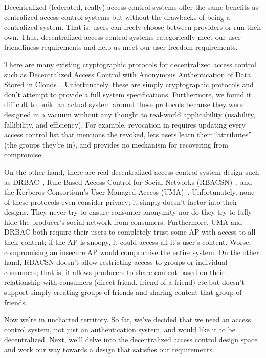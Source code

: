 \documentclass[pdftex,12pt,a4papaer,twoside,notitlepage]{report}
\begin{document}
Decentralized (federated, really) access control systems offer the same benefits
as centralized access control systems but without the drawbacks of being a
centralized system. That is, users can freely choose between providers or run
their own. Thus, decentralized access control systems categorically meet our
user friendliness requirements and help us meet our user freedom requirements.

There are many existing cryptographic protocols for decentralized access control
such as Decentralized Access Control with Anonymous Authentication of Data
Stored in Clouds~\cite{attrib}. Unfortunately, these are simply cryptographic
protocols and don't attempt to provide a full system specifications.
Furthermore, we found it difficult to build an actual system around these
protocols because they were designed in a vacuum without any thought to
real-world applicability (usability, fallibility, and efficiency). For example,
revocation in \cite{attrib} requires updating every access control list that
mentions the revoked, lets users learn their ``attributes'' (the groups they're
in), and provides no mechanism for recovering from compromise.

On the other hand, there are real decentralized access control system design
such as DRBAC~\cite{drbac}, Rule-Based Access Control for Social Networks
(RBACSN)~\cite{socnet}, and the Kerberos Consortium's User Managed Access
(UMA)~\cite{uma}. Unfortunately, none of these protocols even consider privacy;
it simply doesn't factor into their designs. They never try to ensure consumer
anonymity nor do they try to fully hide the producer's social network from
consumers. Furthermore, UMA and DRBAC both require their users to completely
trust some AP with access to all their content; if the AP is snoopy, it could
access all it's user's content. Worse, compromising an insecure AP would
compromise the entire system. On the other hand, RBACSN doesn't allow
restricting access to groups or individual consumers; that is, it allows
producers to share content based on their relationship with consumers (direct
friend, friend-of-a-friend) etc.\@ but doesn't support simply creating groups of
friends and sharing content that group of friends.

Now we're in uncharted territory. So far, we've decided that we need an access
control system, not just an authentication system, and would like it to be
decentralized. Next, we'll delve into the decentralized access control design
space and work our way towards a design that satisfies our requirements.
\end{document}
